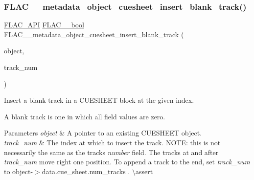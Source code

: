 \subsubsection{\texorpdfstring{FLAC\_\_metadata\_object\_cuesheet\_insert\_blank\_track()}{FLAC\_\_metadata\_object\_cuesheet\_insert\_blank\_track()}}
{\footnotesize\ttfamily \mbox{\hyperlink{group__flac__export_ga56ca07df8a23310707732b1c0007d6f5}{F\+L\+A\+C\+\_\+\+A\+PI}} \mbox{\hyperlink{ordinals_8h_a95103469f1cbd78b8cf250194985b34e}{F\+L\+A\+C\+\_\+\+\_\+bool}} F\+L\+A\+C\+\_\+\+\_\+metadata\+\_\+object\+\_\+cuesheet\+\_\+insert\+\_\+blank\+\_\+track (\begin{DoxyParamCaption}\item[{\mbox{\hyperlink{struct_f_l_a_c_____stream_metadata}{F\+L\+A\+C\+\_\+\+\_\+\+Stream\+Metadata}} $\ast$}]{object,  }\item[{unsigned}]{track\+\_\+num }\end{DoxyParamCaption})}

Insert a blank track in a C\+U\+E\+S\+H\+E\+ET block at the given index.

A blank track is one in which all field values are zero.


\begin{DoxyParams}{Parameters}
{\em object} & A pointer to an existing C\+U\+E\+S\+H\+E\+ET object. \\
\hline
{\em track\+\_\+num} & The index at which to insert the track. N\+O\+TE\+: this is not necessarily the same as the track\textquotesingle{}s {\itshape number} field. The tracks at and after {\itshape track\+\_\+num} move right one position. To append a track to the end, set {\itshape track\+\_\+num} to {\ttfamily object-\/$>$data.\+cue\+\_\+sheet.\+num\+\_\+tracks} . \textbackslash{}assert 
\begin{DoxyCode}{1}
\end{DoxyCode}
 
\begin{DoxyCode}{1}
\end{DoxyCode}
 
\begin{DoxyCode}{1}
\end{DoxyCode}
 \\
\hline
\end{DoxyParams}

